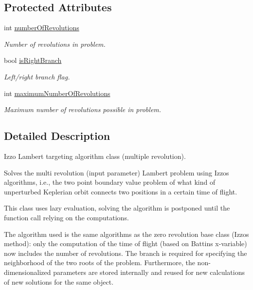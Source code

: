 \subsection*{Protected Attributes}
\begin{DoxyCompactItemize}
\item 
int \hyperlink{classtudat_1_1mission__segments_1_1MultiRevolutionLambertTargeterIzzo_abc7999d932142238f64050ec3c2d4d85}{number\+Of\+Revolutions}
\begin{DoxyCompactList}\small\item\em Number of revolutions in problem. \end{DoxyCompactList}\item 
bool \hyperlink{classtudat_1_1mission__segments_1_1MultiRevolutionLambertTargeterIzzo_a6da335c19c0dfd2a914ec4c08e76a01f}{is\+Right\+Branch}
\begin{DoxyCompactList}\small\item\em Left/right branch flag. \end{DoxyCompactList}\item 
int \hyperlink{classtudat_1_1mission__segments_1_1MultiRevolutionLambertTargeterIzzo_a39d81688a72b0ff52cb5e938ea5af1c4}{maximum\+Number\+Of\+Revolutions}
\begin{DoxyCompactList}\small\item\em Maximum number of revolutions possible in problem. \end{DoxyCompactList}\end{DoxyCompactItemize}


\subsection{Detailed Description}
Izzo Lambert targeting algorithm class (multiple revolution). 

Solves the multi revolution (input parameter) Lambert problem using Izzo\textquotesingle{}s algorithms, i.\+e., the two point boundary value problem of what kind of unperturbed Keplerian orbit connects two positions in a certain time of flight.

This class uses lazy evaluation, solving the algorithm is postponed until the function call relying on the computations.

The algorithm used is the same algorithms as the zero revolution base class (Izzo\textquotesingle{}s method)\+: only the computation of the time of flight (based on Battin\textquotesingle{}s x-\/variable) now includes the number of revolutions. The branch is required for specifying the neighborhood of the two roots of the problem. Furthermore, the non-\/dimensionalized parameters are stored internally and reused for new calculations of new solutions for the same object.


